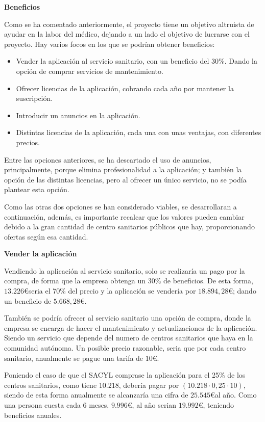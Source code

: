 \textbf{Beneficios}

Como se ha comentado anteriormente, el proyecto tiene un objetivo altruista de ayudar en la labor del médico, dejando a un lado el objetivo de lucrarse con el proyecto. Hay varios focos en los que se podrían obtener beneficios:
\begin{itemize}
    \item Vender la aplicación al servicio sanitario, con un beneficio del 30\%. Dando la opción de comprar servicios de mantenimiento.
    \item Ofrecer licencias de la aplicación, cobrando cada año por mantener la suscripción.
    \item Introducir un anuncios en la aplicación.
    \item Distintas licencias de la aplicación, cada una con unas ventajas, con diferentes precios.
\end{itemize}

Entre las opciones anteriores, se ha descartado el uso de anuncios, principalmente, porque elimina profesionalidad a la aplicación; y también la opción de las distintas licencias, pero al ofrecer un único servicio, no se podía plantear esta opción.

Como las otras dos opciones se han considerado viables, se desarrollaran a continuación, además, es importante recalcar que los valores pueden  cambiar debido a la gran cantidad de centro sanitarios públicos que hay, proporcionando ofertas según esa cantidad.

\textbf{Vender la aplicación}

Vendiendo la aplicación al servicio sanitario, solo se realizaría un pago por la compra, de forma que la empresa obtenga un 30\% de beneficios.
De esta forma, $13.226 $\euro seria el 70\% del precio y la aplicación se vendería por $18.894,28$\euro; dando un beneficio de $5.668,28 $\euro. 

También se podría ofrecer al servicio sanitario una opción de compra, donde la empresa se encarga de hacer el mantenimiento y actualizaciones de la aplicación. Siendo un servicio que depende del numero de centros sanitarios que haya en la comunidad autónoma. Un posible precio razonable, seria que por cada centro sanitario, anualmente se pague una tarifa de $10 $\euro. 

Poniendo el caso de que el SACYL comprase la aplicación para el 25\% de los centros sanitarios, como tiene 10.218,
debería pagar por $(10.218 · 0,25 · 10 ) $, siendo de esta forma anualmente se alcanzaría una cifra de $25.545 $\euro al año.
Como una persona cuesta cada 6 meses, $9.996 $\euro, al año serian $19.992 $\euro, teniendo beneficios anuales.


